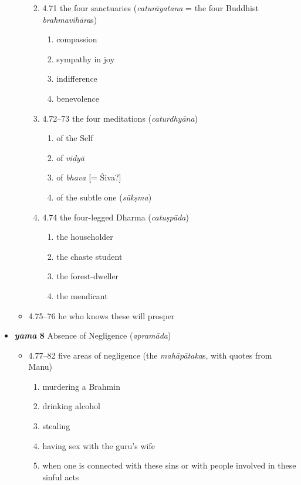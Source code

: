 \documentclass[11pt]{book} %
\newcommand{\skt}[1]{\textit{#1}}
\begin{document}
\begin{itemize}
\begin{itemize}
\begin{enumerate}
      \pagebreak

  \item 4.71 the four sanctuaries (\skt{caturāyatana} = the four Buddhist
              \skt{brahmavihāra}s)
          \begin{enumerate}
          \item compassion
          \item sympathy in joy 
          \item indifference
          \item benevolence
          \end{enumerate}
  \item 4.72--73 the four meditations (\skt{caturdhyāna})
            \begin{enumerate}
      \item of the Self
      \item of \skt{vidyā}
      \item of  \skt{bhava} [= Śiva?] 
      \item of the subtle one (\skt{sūkṣma})
            \end{enumerate}
  \item 4.74 the four-legged Dharma (\skt{catuṣpāda})
              \begin{enumerate}
      \item the householder
      \item the chaste student 
      \item the forest-dweller 
      \item the mendicant
            \end{enumerate}
   \end{enumerate}
\item 4.75--76 he who knows these will prosper
\end{itemize}

\item \textbf{\skt{yama} 8}  Absence of Negligence (\skt{apramāda})
\begin{itemize}
\item4.77--82 five areas of negligence (the \skt{mahāpātaka}s, 
                with quotes from Manu)
            \begin{enumerate}
            \item murdering a Brahmin
            \item drinking alcohol
            \item stealing
            \item having sex with the guru’s wife
            \item when one is connected with these sins or with people involved in these sinful acts
            \end{enumerate}
\end{itemize}


\end{itemize}
\end{document}
